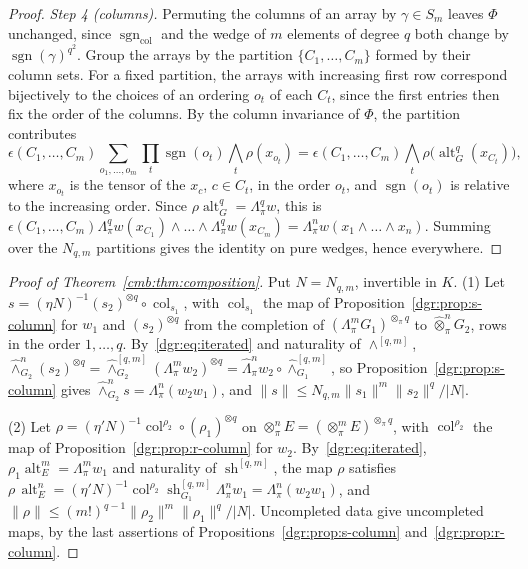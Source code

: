 \documentclass[11pt]{amsart}
\theoremstyle{definition}
\theoremstyle{remark}
\numberwithin{equation}{section}
\newcommand{\sgn}{\operatorname{sgn}}
\newcommand{\abs}[1]{\lvert #1\rvert}
\newcommand{\norm}[1]{\lVert #1\rVert}
\theoremstyle{plain}
\theoremstyle{definition}
\theoremstyle{plain}
\newcommand{\alt}{\operatorname{alt}}
\newcommand{\sh}{\operatorname{sh}}
\begin{document}
\begin{proof}
\emph{Step 4 (columns).} Permuting the columns of an array by $\gamma\in S_m$ leaves $\Phi$ unchanged, since
$\sgn_{\mathrm{col}}$ and the wedge of $m$ elements of degree $q$ both change by $\sgn(\gamma)^{q^2}$. Group the arrays
by the partition $\{C_1,\dots,C_m\}$ formed by their column sets. For a fixed partition, the arrays with increasing first
row correspond bijectively to the choices of an ordering $o_t$ of each $C_t$, since the first entries then fix the order
of the columns. By the column invariance of $\Phi$, the partition contributes
\[
 \epsilon(C_1,\dots,C_m)\sum_{o_1,\dots,o_m}\prod_t\sgn(o_t)\bigwedge_t\rho(x_{o_t})
 =\epsilon(C_1,\dots,C_m)\bigwedge_t\rho\bigl(\alt^q_G(x_{C_t})\bigr),
\]
where $x_{o_t}$ is the tensor of the $x_c$, $c\in C_t$, in the order $o_t$, and $\sgn(o_t)$ is relative to the increasing
order. Since $\rho\alt^q_G=\Lambda^q_\pi w$, this is
$\epsilon(C_1,\dots,C_m)\Lambda^q_\pi w(x_{C_1})\wedge\dots\wedge\Lambda^q_\pi w(x_{C_m})
=\Lambda^n_\pi w(x_1\wedge\dots\wedge x_n)$. Summing over the $N_{q,m}$ partitions gives the identity on pure wedges,
hence everywhere.
\end{proof}

\begin{proof}[Proof of Theorem~\ref{cmb:thm:composition}]
Put $N=N_{q,m}$, invertible in $K$. (1) Let $s=(\eta N)^{-1}(s_2)^{\otimes q}\circ\operatorname{col}_{s_1}$, with
$\operatorname{col}_{s_1}$ the map of Proposition~\ref{dgr:prop:s-column} for $w_1$ and $(s_2)^{\otimes q}$ from the
completion of $(\Lambda^m_\pi G_1)^{\otimes_\pi q}$ to $\widehat\otimes^n_\pi G_2$, rows in the order $1,\dots,q$.
By~\eqref{dgr:eq:iterated} and naturality of $\wedge^{[q,m]}$,
$\widehat\wedge^n_{G_2}(s_2)^{\otimes q}=\widehat\wedge^{[q,m]}_{G_2}(\Lambda^m_\pi w_2)^{\otimes q}
=\widehat\Lambda^n_\pi w_2\circ\widehat\wedge^{[q,m]}_{G_1}$, so Proposition~\ref{dgr:prop:s-column} gives
$\widehat\wedge^n_{G_2}s=\Lambda^n_\pi(w_2w_1)$, and $\norm s\le N_{q,m}\norm{s_1}^m\norm{s_2}^q/\abs N$.

(2) Let $\rho=(\eta'N)^{-1}\operatorname{col}^{\rho_2}\circ(\rho_1)^{\otimes q}$ on
$\otimes^n_\pi E=(\otimes^m_\pi E)^{\otimes_\pi q}$, with $\operatorname{col}^{\rho_2}$ the map of
Proposition~\ref{dgr:prop:r-column} for $w_2$. By~\eqref{dgr:eq:iterated}, $\rho_1\alt^m_E=\Lambda^m_\pi w_1$ and
naturality of $\sh^{[q,m]}$, the map $\rho$ satisfies $\rho\,\alt^n_E=(\eta'N)^{-1}\operatorname{col}^{\rho_2}\sh^{[q,m]}_{G_1}\Lambda^n_\pi w_1
=\Lambda^n_\pi(w_2w_1)$, and $\norm\rho\le(m!)^{q-1}\norm{\rho_2}^m\norm{\rho_1}^q/\abs N$. Uncompleted data give
uncompleted maps, by the last assertions of Propositions~\ref{dgr:prop:s-column} and~\ref{dgr:prop:r-column}.
\end{proof}
\end{document}
